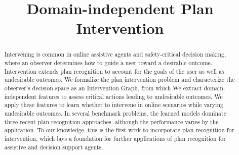 \documentclass[letterpaper]{article}
\theoremstyle{plain}
\begin{document}
\title{Domain-independent Plan Intervention}
\newcommand{\debug}[2]{[\textbf{DEBUG #1}: \textcolor{WildStrawberry}{\textit{#2}}]}
\nocopyright
\maketitle
\begin{abstract}
Intervening is common in online assistive agents and safety-critical decision making, where an observer determines how to guide a user toward a desirable outcome.
Intervention extends plan recognition to account for the goals of the user as well as undesirable outcomes.
We formalize the plan intervention problem and characterize the observer's decision space as an Intervention Graph, from which 
We extract domain-independent features to assess critical actions leading to undesirable outcomes.
We apply these features to learn whether to intervene in online scenarios while varying undesirable outcomes.
In several benchmark problems, the learned models dominate three recent plan recognition approaches, although the performance varies by the application.
To our knowledge, this is the first work to incorporate plan recognition for intervention, which lays a foundation for further applications of plan recognition for assistive and decision support agents.
\end{abstract}
\end{document}
